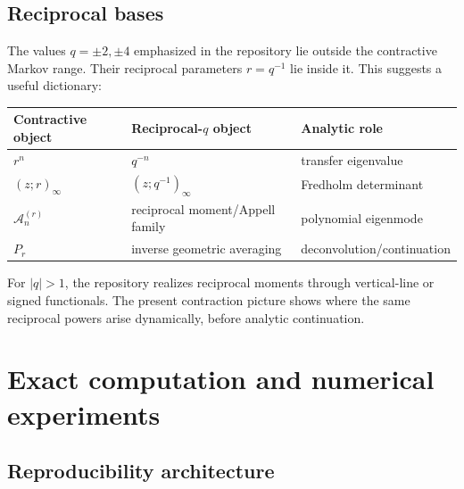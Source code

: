 \documentclass[11pt,a4paper]{article}
\theoremstyle{definition}
\theoremstyle{remark}
\newcommand{\Acal}{\mathcal A}
\begin{document}
\subsection{Reciprocal bases}

The values $q=\pm2,\pm4$ emphasized in the repository lie outside the contractive Markov range. Their reciprocal parameters $r=q^{-1}$ lie inside it. This suggests a useful dictionary:
\begin{center}
\begin{tabular}{@{}lll@{}}
\toprule
Contractive object & Reciprocal-$q$ object & Analytic role \\
\midrule
$r^n$ & $q^{-n}$ & transfer eigenvalue \\
$(z;r)_\infty$ & $(z;q^{-1})_\infty$ & Fredholm determinant \\
$\Acal_n^{(r)}$ & reciprocal moment/Appell family & polynomial eigenmode \\
$P_r$ & inverse geometric averaging & deconvolution/continuation \\
\bottomrule
\end{tabular}
\end{center}
For $|q|>1$, the repository realizes reciprocal moments through vertical-line or signed functionals. The present contraction picture shows where the same reciprocal powers arise dynamically, before analytic continuation.

\section{Exact computation and numerical experiments}
\label{sec:numerics}

\subsection{Reproducibility architecture}
\end{document}

